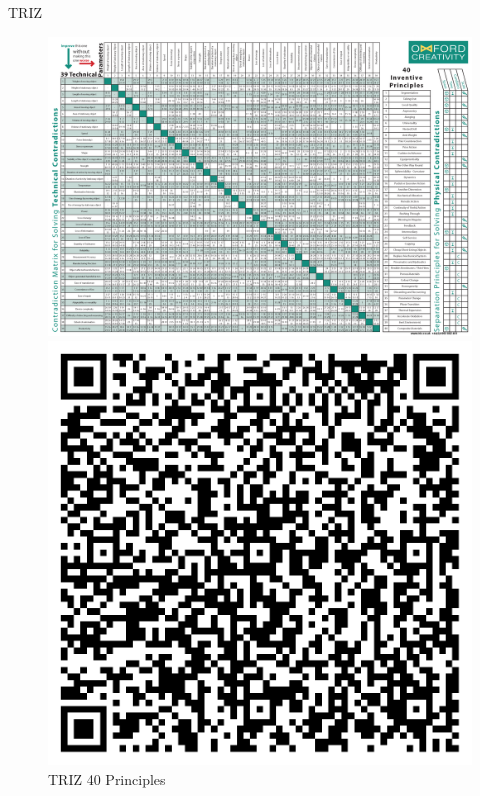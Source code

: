 \documentclass[final]{beamer}
\begin{document}
\begin{frame}{}
\begin{columns}[t]
\begin{column}{.35\linewidth}
\begin{block}{TRIZ}
				\begin{figure}
					\centering
					\begin{minipage}{0.63\linewidth}
						\centering
						\includegraphics[width=\linewidth]{./images/triz_matrix.png}
						\caption{Example of a TRIZ Contradiction Matrix}
					\end{minipage}
					\hfill
					\begin{minipage}{0.35\linewidth}
						\centering
						\includegraphics[width=0.8\linewidth]{./images/triz_qrcode.png}
						\caption{TRIZ 40 Principles}
					\end{minipage}
				\end{figure}

			\end{block}
			\vspace{1cm}


\end{column}
\end{columns}
\end{frame}
\end{document}
